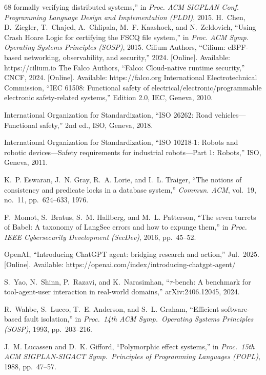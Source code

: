 \documentclass[10pt,journal,compsoc]{IEEEtran}
\begin{document}
\begin{thebibliography}{68}
formally verifying distributed systems,'' in \emph{Proc. ACM SIGPLAN Conf.
Programming Language Design and Implementation (PLDI)}, 2015.
 H.~Chen, D.~Ziegler, T.~Chajed, A.~Chlipala, M.~F.
Kaashoek, and N.~Zeldovich, ``Using Crash Hoare Logic for certifying the
FSCQ file system,'' in \emph{Proc. ACM Symp. Operating Systems Principles
(SOSP)}, 2015.
 Cilium Authors, ``Cilium: eBPF-based networking,
observability, and security,'' 2024. [Online]. Available:
https://cilium.io
 The Falco Authors, ``Falco: Cloud-native runtime security,''
CNCF, 2024. [Online]. Available: https://falco.org
 International Electrotechnical Commission, ``IEC 61508:
Functional safety of electrical/electronic/programmable electronic safety-related
systems,'' Edition 2.0, IEC, Geneva, 2010.

 International Organization for Standardization, ``ISO 26262:
Road vehicles---Functional safety,'' 2nd ed., ISO, Geneva, 2018.

 International Organization for Standardization, ``ISO
10218-1: Robots and robotic devices---Safety requirements for industrial
robots---Part 1: Robots,'' ISO, Geneva, 2011.

 K.~P. Eswaran, J.~N. Gray, R.~A. Lorie, and I.~L.
Traiger, ``The notions of consistency and predicate locks in a database
system,'' \emph{Commun. ACM}, vol.~19, no.~11, pp.~624--633, 1976.

 F.~Momot, S.~Bratus, S.~M. Hallberg, and M.~L.
Patterson, ``The seven turrets of Babel: A taxonomy of LangSec errors and
how to expunge them,'' in \emph{Proc. IEEE Cybersecurity Development
(SecDev)}, 2016, pp.~45--52.

 OpenAI, ``Introducing ChatGPT agent: bridging
research and action,'' Jul.~2025. [Online]. Available:
https://openai.com/index/introducing-chatgpt-agent/

 S.~Yao, N.~Shinn, P.~Razavi, and K.~Narasimhan,
``$\tau$-bench: A benchmark for tool-agent-user interaction in real-world
domains,'' arXiv:2406.12045, 2024.

 R.~Wahbe, S.~Lucco, T.~E. Anderson, and S.~L. Graham,
``Efficient software-based fault isolation,'' in \emph{Proc.\ 14th ACM Symp.\
Operating Systems Principles (SOSP)}, 1993, pp.~203--216.

 J.~M. Lucassen and D.~K. Gifford, ``Polymorphic effect
systems,'' in \emph{Proc.\ 15th ACM SIGPLAN-SIGACT Symp.\ Principles of
Programming Languages (POPL)}, 1988, pp.~47--57.


\end{thebibliography}
\end{document}
